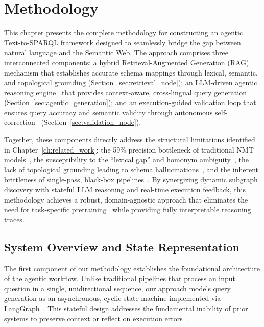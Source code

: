 \newpage

\section{Methodology}
\label{ch:methodology}

This chapter presents the complete methodology for constructing an agentic Text-to-SPARQL framework designed to seamlessly bridge the gap between natural language and the Semantic Web. The approach comprises three interconnected components: a hybrid Retrieval-Augmented Generation (RAG)~\cite{lewis2020rag} mechanism that establishes accurate schema mappings through lexical, semantic, and topological grounding (Section~\ref{sec:retrieval_node}); an LLM-driven agentic reasoning engine~\cite{weng2023agents} that provides context-aware, cross-lingual query generation (Section~\ref{sec:agentic_generation}); and an execution-guided validation loop that ensures query accuracy and semantic validity through autonomous self-correction~\cite{zhao_agentict2srobust_2025} (Section~\ref{sec:validation_node}).

Together, these components directly address the structural limitations identified in Chapter~\ref{ch:related_work}: the 59\% precision bottleneck of traditional NMT models~\cite{santana2022sparqlqa}, the susceptibility to the ``lexical gap'' and homonym ambiguity~\cite{hoffner_survey_2017}, the lack of topological grounding leading to schema hallucinations~\cite{sui_can_2025}, and the inherent brittleness of single-pass, black-box pipelines~\cite{mecharnia_performance_2025}. By synergizing dynamic subgraph discovery with stateful LLM reasoning and real-time execution feedback, this methodology achieves a robust, domain-agnostic approach that eliminates the need for task-specific pretraining~\cite{dabramo_investigating_2025} while providing fully interpretable reasoning traces.

\subsection{System Overview and State Representation}
\label{sec:system_overview}

The first component of our methodology establishes the foundational architecture of the agentic workflow. Unlike traditional pipelines that process an input question in a single, unidirectional sequence, our approach models query generation as an asynchronous, cyclic state machine implemented via LangGraph~\cite{langchain2024langgraph}. This stateful design addresses the fundamental inability of prior systems to preserve context or reflect on execution errors~\cite{ji_retrieval--reasoning_2026, zhao_agentict2srobust_2025}.
\newpage

